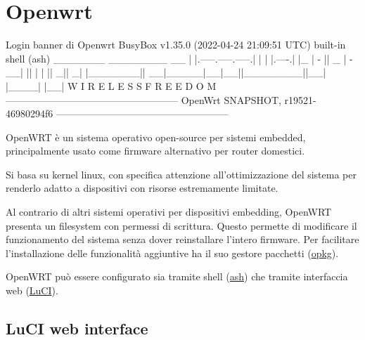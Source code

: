 \section{Openwrt}

\begin{bashcode}{Login banner di Openwrt}{}
BusyBox v1.35.0 (2022-04-24 21:09:51 UTC) built-in shell (ash)
    _______                     ________        __
    |       |.-----.-----.-----.|  |  |  |.----.|  |_
    |   -   ||  _  |  -__|     ||  |  |  ||   _||   _|
    |_______||   __|_____|__|__||________||__|  |____|
            |__| W I R E L E S S   F R E E D O M
    -----------------------------------------------------
    OpenWrt SNAPSHOT, r19521-46980294f6
    -----------------------------------------------------
\end{bashcode}


OpenWRT è un sistema operativo open-source per sistemi embedded, principalmente usato come firmware alternativo per router domestici.

Si basa su kernel linux, con specifica attenzione all'ottimizzazione del sistema per renderlo adatto a dispositivi con risorse estremamente limitate.

Al contrario di altri sistemi operativi per dispositivi embedding, OpenWRT presenta un filesystem con permessi di scrittura. Questo permette di modificare il funzionamento del sistema senza dover reinstallare l'intero firmware. Per facilitare l'installazione delle funzionalità aggiuntive ha il suo gestore pacchetti (\href{https://openwrt.org/docs/guide-user/additional-software/opkg}{opkg}).


OpenWRT può essere configurato sia tramite shell (\href{https://en.wikipedia.org/wiki/Almquist_shell}{ash}) che tramite interfaccia web (\href{https://openwrt.org/docs/guide-user/luci/start}{LuCI}).


\subsection{LuCI web interface}


